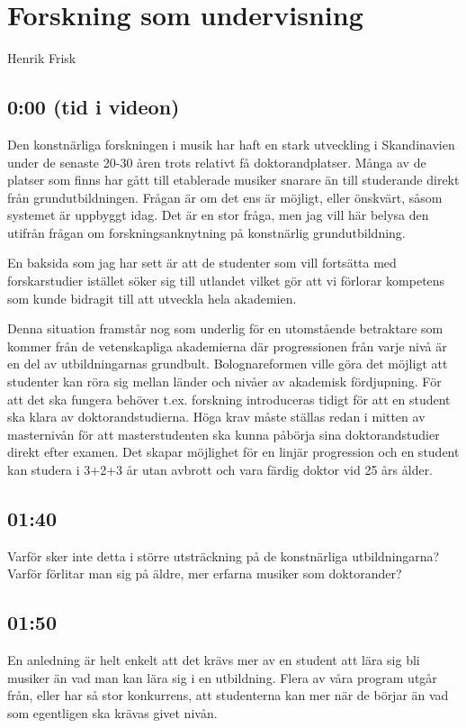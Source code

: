 \documentclass[11pt]{article}
\author{Henrik Frisk}
\date{\today}
\title{}
\begin{document}
\renewcommand\familydefault{\sfdefault}

\section*{Forskning som undervisning}
\label{sec:org09b42a8}
Henrik Frisk

\subsection*{0:00 (tid i videon)}
\label{sec:orgc65afd9}
Den konstnärliga forskningen i musik har haft en stark utveckling i Skandinavien under de senaste 20-30 åren trots relativt få doktorandplatser. Många av de platser som finns har gått till etablerade musiker snarare än till studerande direkt från grundutbildningen. Frågan är om det ens är möjligt, eller önskvärt, såsom systemet är uppbyggt idag. Det är en stor fråga, men jag vill här belysa den utifrån frågan om forskningsanknytning på konstnärlig grundutbildning.

En baksida som jag har sett är att de studenter som vill fortsätta med forskarstudier istället söker sig till utlandet vilket gör att vi förlorar kompetens som kunde bidragit till att utveckla hela akademien.

Denna situation framstår nog som underlig för en utomstående betraktare som kommer från de vetenskapliga akademierna där progressionen från varje nivå är en del av utbildningarnas grundbult. Bolognareformen ville göra det möjligt att studenter kan röra sig mellan länder och nivåer av akademisk fördjupning. För att det ska fungera behöver t.ex. forskning introduceras tidigt för att en student ska klara av doktorandstudierna. Höga krav måste ställas redan i mitten av masternivån för att masterstudenten ska kunna påbörja sina doktorandstudier direkt efter examen. Det skapar möjlighet för en linjär progression och en student kan studera i 3+2+3 år utan avbrott och vara färdig doktor vid 25 års ålder.
\subsection*{01:40}
\label{sec:org64f6ae8}
Varför sker inte detta i större utsträckning på de konstnärliga utbildningarna? Varför förlitar man sig på äldre, mer erfarna musiker som doktorander?
\subsection*{01:50}
\label{sec:orgc629820}
En anledning är helt enkelt att det krävs mer av en student att lära sig bli musiker än vad man kan lära sig i en utbildning. Flera av våra program utgår från, eller har så stor konkurrens, att studenterna kan mer när de börjar än vad som egentligen ska krävas givet nivån.
\end{document}
